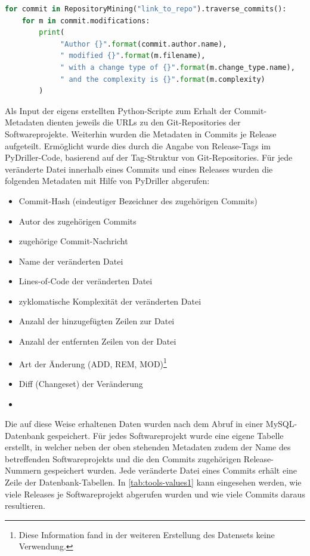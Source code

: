 \begin{lstlisting}[language=Python, caption=Beispielhafter PyDriller-Code zur Ausgabe von Metadaten von Commits, frame=single, label=pydriller]
for commit in RepositoryMining("link_to_repo").traverse_commits(): 
	for m in commit.modifications: 
		print( 
		     "Author {}".format(commit.author.name), 
		     " modified {}".format(m.filename), 
		     " with a change type of {}".format(m.change_type.name), 
		     " and the complexity is {}".format(m.complexity) 
		)
\end{lstlisting}

Als Input der eigens erstellten Python-Scripte zum Erhalt der Commit-Metadaten dienten jeweils die URLs zu den Git-Repositories der Softwareprojekte. Weiterhin wurden die Metadaten in Commits je Release aufgeteilt. Ermöglicht wurde dies durch die Angabe von Release-Tags im PyDriller-Code, basierend auf der Tag-Struktur von Git-Repositories. Für jede veränderte Datei innerhalb eines Commits und eines Releases wurden die folgenden Metadaten mit Hilfe von PyDriller abgerufen:

\begin{multicols}{2}
\begin{itemize}
\setlength{\itemsep}{-2pt}
\item Commit-Hash (eindeutiger Bezeichner des zugehörigen Commits)
\item Autor des zugehörigen Commits
\item zugehörige Commit-Nachricht
\item Name der veränderten Datei
\item Lines-of-Code der veränderten Datei
\item zyklomatische Komplexität der veränderten Datei
\item Anzahl der hinzugefügten Zeilen zur Datei
\item Anzahl der entfernten Zeilen von der Datei
\item Art der Änderung (ADD, REM, MOD)\footnote{Diese Information fand in der weiteren Erstellung des Datensets keine Verwendung.}
\item Diff (Changeset) der Veränderung
\item[\vspace{\fill}]
\end{itemize}
\end{multicols}

Die auf diese Weise erhaltenen Daten wurden nach dem Abruf in einer MySQL-Datenbank gespeichert. Für jedes Softwareprojekt wurde eine eigene Tabelle erstellt, in welcher neben der oben stehenden Metadaten zudem der Name des betreffenden Softwareprojekts und die den Commits zugehörigen Release-Nummern gespeichert wurden. Jede veränderte Datei eines Commits erhält eine Zeile der Datenbank-Tabellen. In \autoref{tab:tools-values1} kann eingesehen werden, wie viele Releases je Softwareprojekt abgerufen wurden und wie viele Commits daraus resultieren.


